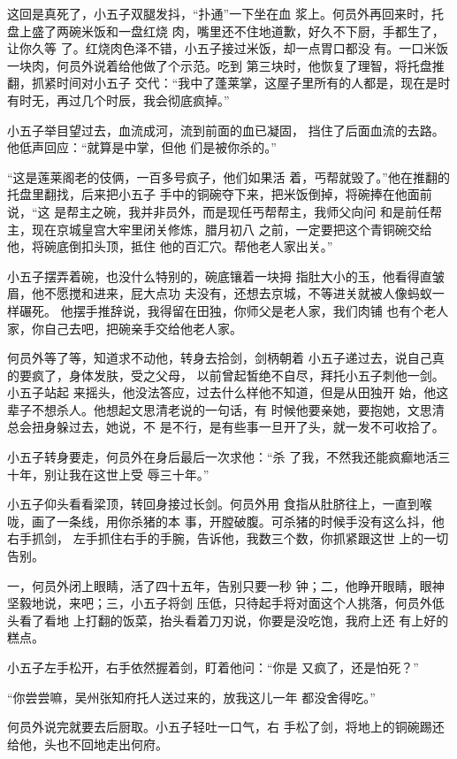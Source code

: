 这回是真死了，小五子双腿发抖，“扑通”一下坐在血
浆上。何员外再回来时，托盘上盛了两碗米饭和一盘红烧
肉，嘴里还不住地道歉，好久不下厨，手都生了，让你久等
了。红烧肉色泽不错，小五子接过米饭，却一点胃口都没
有。一口米饭一块肉，何员外说着给他做了个示范。吃到
第三块时，他恢复了理智，将托盘推翻，抓紧时间对小五子
交代：“我中了蓬莱掌，这屋子里所有的人都是，现在是时
有时无，再过几个时辰，我会彻底疯掉。”

小五子举目望过去，血流成河，流到前面的血已凝固，
挡住了后面血流的去路。他低声回应：“就算是中掌，但他
们是被你杀的。”

“这是莲莱阁老的伎俩，一百多号疯子，他们如果活
着，丐帮就毁了。”他在推翻的托盘里翻找，后来把小五子
手中的铜碗夺下来，把米饭倒掉，将碗捧在他面前说，“这
是帮主之碗，我并非员外，而是现任丐帮帮主，我师父向问
和是前任帮主，现在京城皇宫大牢里闭关修炼，腊月初八
之前，一定要把这个青铜碗交给他，将碗底倒扣头顶，抵住
他的百汇穴。帮他老人家出关。”

小五子摆弄着碗，也没什么特别的，碗底镶着一块拇
指肚大小的玉，他看得直皱眉，他不愿搅和进来，屁大点功
夫没有，还想去京城，不等进关就被人像蚂蚁一样碾死。
他摆手推辞说，我得留在田独，你师父是老人家，我们肉铺
也有个老人家，你自己去吧，把碗亲手交给他老人家。

何员外等了等，知道求不动他，转身去拾剑，剑柄朝着
小五子递过去，说自己真的要疯了，身体发肤，受之父母，
以前曾起皙绝不自尽，拜托小五子刺他一剑。小五子站起
来摇头，他没法答应，过去什么样他不知道，但是从田独开
始，他这辈子不想杀人。他想起文思清老说的一句话，有
时候他要亲她，要抱她，文思清总会扭身躲过去，她说，不
是不行，是有些事一旦开了头，就一发不可收拾了。

小五子转身要走，何员外在身后最后一次求他：“杀
了我，不然我还能疯癫地活三十年，别让我在这世上受
辱三十年。”

小五子仰头看看梁顶，转回身接过长剑。何员外用
食指从肚脐往上，一直到喉咙，画了一条线，用你杀猪的本
事，开膛破腹。可杀猪的时候手没有这么抖，他右手抓剑，
左手抓住右手的手腕，告诉他，我数三个数，你抓紧跟这世
上的一切告别。

一，何员外闭上眼睛，活了四十五年，告别只要一秒
钟；二，他睁开眼睛，眼神坚毅地说，来吧；三，小五子将剑
压低，只待起手将对面这个人挑落，何员外低头看了看地
上打翻的饭菜，抬头看着刀刃说，你要是没吃饱，我府上还
有上好的糕点。

小五子左手松开，右手依然握着剑，盯着他问：“你是
又疯了，还是怕死？”

“你尝尝嘛，吴州张知府托人送过来的，放我这儿一年
都没舍得吃。”

何员外说完就要去后厨取。小五子轻吐一口气，右
手松了剑，将地上的铜碗踢还给他，头也不回地走出何府。
\newline

